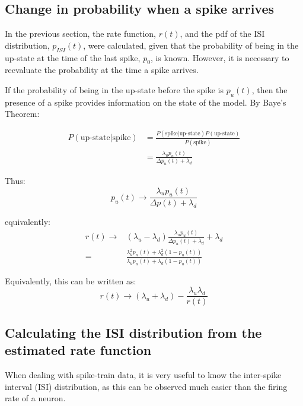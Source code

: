 \subsection{Change in probability when a spike arrives}

In the previous section, the rate function, $r(t)$, and the pdf of the ISI distribution, $p_{ISI}(t)$, were calculated, given that the probability of being in the up-state at the time of the last spike, $p_0$, is known.  However, it is necessary to reevaluate the probability at the time a spike arrives.

If the probability of being in the up-state before the spike is $p_u(t)$, then the presence of a spike provides information on the state of the model. By Baye's Theorem:

\begin{equation}
\begin{split}
P(\mbox{up-state} | \mbox{spike}) &= \frac{P(\mbox{spike}|\mbox{up-state})P(\mbox{up-state})}{P(\mbox{spike})} \\
&=\frac{\lambda_u p_u(t)}{\Delta p_u(t) + \lambda_d }
\end{split}
\end{equation}

Thus:
\begin{equation}
p_u(t) \rightarrow \frac{\lambda_u p_u(t)}{\Delta p(t) + \lambda_d}
\end{equation}

equivalently:
\begin{equation}
\begin{split}
r(t) \rightarrow &(\lambda_u - \lambda_d)\frac{\lambda_u p_u(t)}{\Delta p_u(t)+ \lambda_d} + \lambda_d\\
= & \frac{\lambda_u^2 p_u(t) + \lambda_d^2(1-p_u(t))}{\lambda_up_u(t) + \lambda_d(1-p_u(t))}
\end{split}
\end{equation}

Equivalently, this can be written as:
\begin{equation}
r(t) \rightarrow (\lambda_u +\lambda_d) - \frac{\lambda_u\lambda_d}{r(t)}
\end{equation}

\subsection{Calculating the ISI distribution from the estimated rate function}
When dealing with spike-train data, it is very useful to know the inter-spike interval (ISI) distribution, as this can be observed much easier than the firing rate of a neuron.

